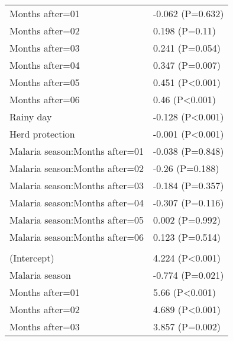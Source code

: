 \documentclass[]{article}
\begin{document}
\begin{longtable}[t]{ll}
\hspace{1em}Months after=01 & -0.062 (P=0.632)\\
\hspace{1em}Months after=02 & 0.198 (P=0.11)\\
\hspace{1em}Months after=03 & 0.241 (P=0.054)\\
\hspace{1em}Months after=04 & 0.347 (P=0.007)\\
\hspace{1em}Months after=05 & 0.451 (P<0.001)\\
\hspace{1em}Months after=06 & 0.46 (P<0.001)\\
\hspace{1em}Rainy day & -0.128 (P<0.001)\\
\hspace{1em}Herd protection & -0.001 (P<0.001)\\
\hspace{1em}Malaria season:Months after=01 & -0.038 (P=0.848)\\
\hspace{1em}Malaria season:Months after=02 & -0.26 (P=0.188)\\
\hspace{1em}Malaria season:Months after=03 & -0.184 (P=0.357)\\
\hspace{1em}Malaria season:Months after=04 & -0.307 (P=0.116)\\
\hspace{1em}Malaria season:Months after=05 & 0.002 (P=0.992)\\
\hspace{1em}Malaria season:Months after=06 & 0.123 (P=0.514)\\
\addlinespace[1.5em]
\multicolumn{2}{l}{\textbf{Temporary not field worker}}\\
\hspace{1em}(Intercept) & 4.224 (P<0.001)\\
\hspace{1em}Malaria season & -0.774 (P=0.021)\\
\hspace{1em}Months after=01 & 5.66 (P<0.001)\\
\hspace{1em}Months after=02 & 4.689 (P<0.001)\\
\hspace{1em}Months after=03 & 3.857 (P=0.002)\\

\end{longtable}
\end{document}
